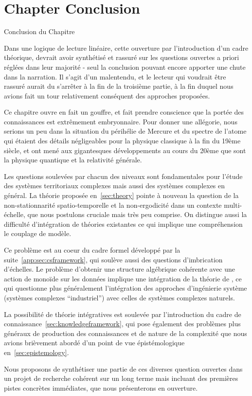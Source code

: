 



\newpage


\section*{Chapter Conclusion}{Conclusion du Chapitre}


Dans une logique de lecture linéaire, cette ouverture par l'introduction d'un cadre théorique, devrait avoir synthétisé et rassuré sur les questions ouvertes a priori réglées dans leur majorité - seul la conclusion pouvant encore apporter une chute dans la narration. Il s'agit d'un malentendu, et le lecteur qui voudrait être rassuré aurait du s'arrêter à la fin de la troisième partie, à la fin duquel nous avions fait un tour relativement conséquent des approches proposées.


Ce chapitre ouvre en fait un gouffre, et fait prendre conscience que la portée des connaissances est extrêmement embryonnaire. Pour donner une allégorie, nous serions un peu dans la situation du périhélie de Mercure et du spectre de l'atome qui étaient des détails négligeables pour la physique classique à la fin du 19ème siècle, et ont mené aux gigantesques développements au cours du 20ème que sont la physique quantique et la relativité générale.

Les questions soulevées par chacun des niveaux sont fondamentales pour l'étude des systèmes territoriaux complexes mais aussi des systèmes complexes en général. La théorie proposée en~\ref{sec:theory} pointe à nouveau la question de la non-stationnarité spatio-temporelle et la non-ergodicité dans un contexte multi-échelle, que nous postulons cruciale mais très peu comprise. On distingue aussi la difficulté d'intégration de théories existantes ce qui implique une compréhension le couplage de modèle.

Ce problème est au coeur du cadre formel développé par la suite~\ref{app:sec:csframework}, qui soulève aussi des questions d'imbrication d'échelles. Le problème d'obtenir une structure algébrique cohérente avec une action de monoïde sur les données implique une intégration de la théorie de , ce qui questionne plus généralement l'intégration des approches d'ingénierie système (systèmes complexes ``industriel'') avec celles de systèmes complexes naturels.

La possibilité de théorie intégratives est soulevée par l'introduction du cadre de connaissance~\ref{sec:knowledgeframework}, qui pose également des problèmes plus généraux de production des connaissances et de nature de la complexité que nous avions brièvement abordé d'un point de vue épistémologique en~\ref{sec:epistemology}.


Nous proposons de synthétiser une partie de ces diverses question ouvertes dans un projet de recherche cohérent sur un long terme mais incluant des premières pistes concrètes immédiates, que nous présenterons en ouverture.




\stars
